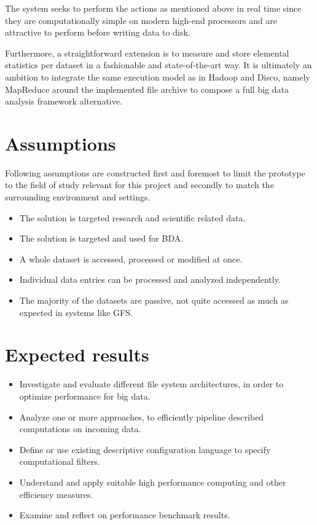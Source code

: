 The system seeks to perform the actions as mentioned above in real time since they are computationally simple on modern high-end processors and are attractive to perform before writing data to disk. 
\newline

Furthermore, a straightforward extension is to measure and store elemental statistics per dataset in a fashionable and state-of-the-art way. It is ultimately an ambition to integrate the same execution model as in \eg Hadoop and Disco, namely MapReduce around the implemented file archive to compose a full big data analysis framework alternative.

\section{Assumptions} \label{sec:assumption}
Following assumptions are constructed first and foremost to limit the prototype to the field of study relevant for this project and secondly to match the surrounding environment and settings.

\begin{itemize}
	\item The solution is targeted research and scientific related data. 
	\item The solution is targeted and used for BDA.
	\item A whole dataset is accessed, processed or modified at once.
	\item Individual data entries can be processed and analyzed independently.
	\item The majority of the datasets are passive, \eg not quite accessed as much as expected in systems like GFS.
\end{itemize}

\section{Expected results} \label{sec:expected-results}
\begin{itemize}
	\item Investigate and evaluate different file system architectures, in order to optimize performance for big data.	
	\item Analyze one or more approaches, to efficiently pipeline described computations on incoming data.
	\item Define or use existing descriptive configuration language to specify computational filters.
	\item Understand and apply suitable high performance computing and other efficiency measures.
	\item Examine and reflect on performance benchmark results.
\end{itemize}

\section{}

